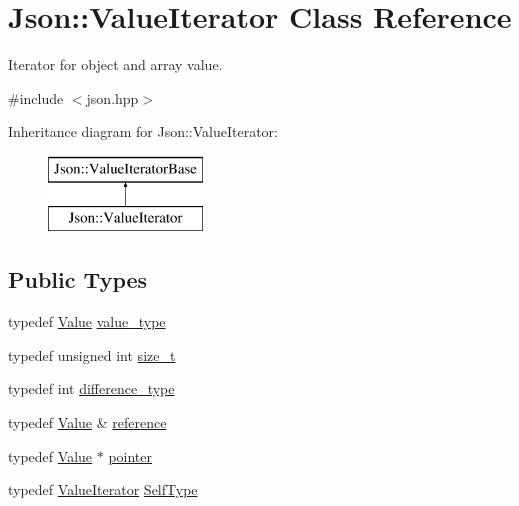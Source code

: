 \hypertarget{class_json_1_1_value_iterator}{\section{Json\-:\-:Value\-Iterator Class Reference}
\label{class_json_1_1_value_iterator}
}


Iterator for object and array value.  




{\ttfamily \#include $<$json.\-hpp$>$}

Inheritance diagram for Json\-:\-:Value\-Iterator\-:\begin{figure}[H]
\begin{center}
\leavevmode
\includegraphics[height=2.000000cm]{class_json_1_1_value_iterator}
\end{center}
\end{figure}
\subsection*{Public Types}
\begin{DoxyCompactItemize}
\item 
typedef \hyperlink{class_json_1_1_value}{Value} \hyperlink{class_json_1_1_value_iterator_a2c5ba7be611f05546530c8a88b2d2e37}{value\-\_\-type}
\item 
typedef unsigned int \hyperlink{class_json_1_1_value_iterator_a308b8932ffc83eaa9d12dadd5c11a7dd}{size\-\_\-t}
\item 
typedef int \hyperlink{class_json_1_1_value_iterator_a2be1a9aa60bbfc8812e9dd1a7f1a8786}{difference\-\_\-type}
\item 
typedef \hyperlink{class_json_1_1_value}{Value} \& \hyperlink{class_json_1_1_value_iterator_ae87929b4567aa00372cf602c43b57160}{reference}
\item 
typedef \hyperlink{class_json_1_1_value}{Value} $\ast$ \hyperlink{class_json_1_1_value_iterator_acec45feb1ef1f3bf81240157d06d5432}{pointer}
\item 
typedef \hyperlink{class_json_1_1_value_iterator}{Value\-Iterator} \hyperlink{class_json_1_1_value_iterator_a23357670fdad61792670d86f62db7e16}{Self\-Type}
\end{DoxyCompactItemize}
